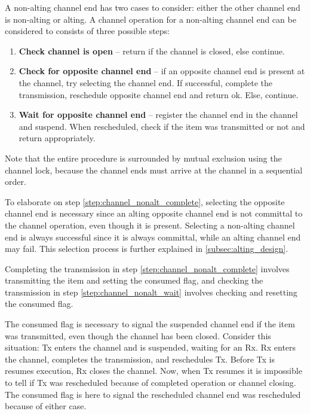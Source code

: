 A non\hyp{}alting channel end has two cases to consider: either the other channel end is non\hyp{}alting or alting. 
A channel operation for a non\hyp{}alting channel end can be considered to consists of three possible steps:

\begin{enumerate}[topsep=0em,itemsep=-1em,partopsep=0.5em,parsep=1em]
    \item \textbf{Check channel is open} -- return if the channel is closed, else continue.
    \item \textbf{Check for opposite channel end} -- if an opposite channel end is present at the channel, try selecting the channel end. If successful, complete the transmission, reschedule opposite channel end and return ok. Else, continue.
    \label{step:channel_nonalt_complete}
    \item \textbf{Wait for opposite channel end} -- register the channel end in the channel and suspend. When rescheduled, check if the item was transmitted or not and return appropriately.
    \label{step:channel_nonalt_wait}
\end{enumerate}

Note that the entire procedure is surrounded by mutual exclusion using the channel lock, because the channel ends must arrive at the channel in a sequential order.

To elaborate on step \cref{step:channel_nonalt_complete}, selecting the opposite channel end is necessary since an alting opposite channel end is not committal to the channel operation, even though it is present. Selecting a non\hyp{}alting channel end is always successful since it is always committal, while an alting channel end may fail. This selection process is further explained in \cref{subsec:alting_design}.

Completing the transmission in step \ref{step:channel_nonalt_complete} involves transmitting the item and setting the consumed flag, and checking the transmission in step \ref{step:channel_nonalt_wait} involves checking and resetting the consumed flag.

The consumed flag is necessary to signal the suspended channel end if the item was transmitted, even though the channel has been closed. Consider this situation: Tx enters the channel and is suspended, waiting for an Rx. Rx enters the channel, completes the transmission, and reschedules Tx. Before Tx is resumes execution, Rx closes the channel. Now, when Tx resumes it is impossible to tell if Tx was rescheduled because of completed operation or channel closing. The consumed flag is here to signal the rescheduled channel end was rescheduled because of either case.


